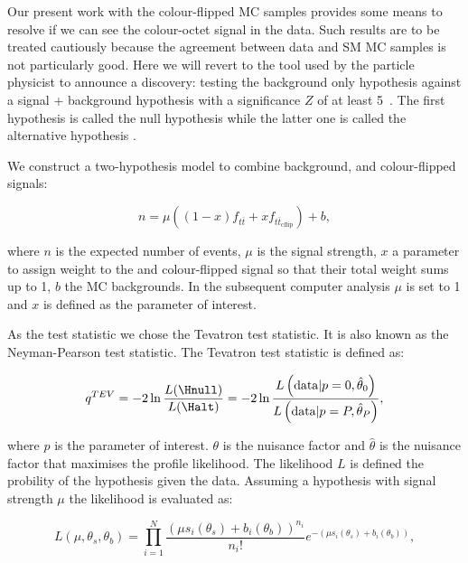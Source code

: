 \label{subsec:hypo_testing}

Our present work with the colour-flipped MC samples provides some means to resolve if we can see the colour-octet \PW signal in the data. Such results are to be treated cautiously because the agreement between data and SM MC samples is not particularly good. Here we will revert to the tool used by the particle physicist to announce a discovery: testing the background only hypothesis against a signal + background hypothesis with a significance $Z$ of at least 5~\cite{Cowan:2010js}. The first hypothesis is called the null hypothesis \Hnull while the latter one is called the alternative hypothesis \Halt.

We construct a two-hypothesis model to combine background, \ttbar and colour-flipped \ttbar signals:

\begin{equation}
  n=\mu\left(\left(1-x\right)f_{t\overline{t}}+xf_{t\overline{t}_{\text{cflip}}}\right)+b,
  \label{eq:two_hypo_model}
\end{equation}

\noindent where $n$ is the expected number of events, $\mu$ is the signal strength, $x$ a parameter to assign weight to the \ttbar and colour-flipped \ttbar signal so that their total weight sums up to 1, $b$ \textendash the MC backgrounds. In the subsequent computer analysis $\mu$ is set to 1 and $x$ is defined as the parameter of interest.

As the test statistic we chose the Tevatron test statistic. It is also known as the Neyman-Pearson test statistic. The Tevatron test statistic is defined as:

\begin{equation}
  q^{TEV}=-2\ln{\frac{L(\Hnull)}{L(\Halt)}}=-2\ln{\frac{L\left(\text{data}|p=0,\hat{\theta}_{0}\right)}{L\left(\text{data}|p=P,\hat{\theta}_{P}\right)}},
\end{equation}

\noindent where $p$ is the parameter of interest. $\theta$ is the nuisance factor and $\hat{\theta}$ is the nuisance factor that maximises the profile likelihood. The likelihood $L$ is defined the probility of the hypothesis given the data. Assuming a hypothesis with signal strength $\mu$ the likelihood is evaluated as:

\begin{equation}
  L(\mu, \theta_{s}, \theta_{b})=\prod_{i=1}^{N}\frac{(\mu s_{i}(\theta_{s})+b_{i}(\theta_{b}))^{n_{i}}}{n_{i}!}e^{-\left(\mu s_{i}(\theta_{s})+b_{i}(\theta_{b})\right)},
\end{equation}

